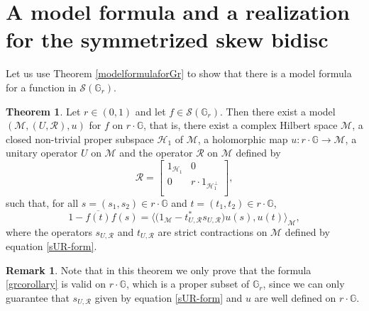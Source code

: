\documentclass[12pt,reqno]{amsart}
\numberwithin{equation}{section}
\theoremstyle{definition}
\newtheorem{thm}[equation]{Theorem}
\newtheorem{remark}[equation]{Remark}
\begin{document}
\section{A model formula and a realization for  the symmetrized skew bidisc}

Let us use Theorem \ref{modelformulaforGr} to show that there is a model formula for a function in $\mathcal{S}(\mathbb{G}_{r})$. 
\begin{thm}\label{modelforsur}
Let $r\in(0,1)$ and let $f\in\mathcal{S}(\mathbb{G}_{r})$. Then there exist a model $(\mathcal{M}, (U,\mathcal{R}), u)$ for $f$ on $r\cdot \mathbb{G}$, that is, there exist a complex Hilbert space $\mathcal{M}$,  a closed non-trivial proper subspace  $\mathcal{H}_{1}$ of $\mathcal{M}$,
 a holomorphic map $u:r\cdot \mathbb{G}\rightarrow \mathcal{M}$, a unitary operator $U$ on $\mathcal{M}$ and the operator $\mathcal{R}$ on $\mathcal{M}$ defined by 
\begin{equation}\label{RonM-2}
\mathcal{R}=\begin{bmatrix}
	1_{\mathcal{H}_{1}  } 	& 0                \\
	0 		& r\cdot 1_{\mathcal{H}_{1}^{\perp}}  	\\
\end{bmatrix},
\end{equation} 
such that, for all $s=(s_{1},s_{2})\in r\cdot\mathbb{G}$ and $t=(t_{1},t_{2})\in r \cdot \mathbb{G}$,
\begin{equation}\label{grcorollary}
1- \overline{f(t)}f(s) =\Bigg\langle  \bigg(1_{\mathcal{M}}-t_{U,\mathcal{R}}^{*}s_{U,\mathcal{R}}\bigg)u(s),u(t)\Bigg\rangle_{\mathcal{M}},
  \end{equation}
where the operators $s_{U,\mathcal{R}}$ and $t_{U,\mathcal{R}}$ are strict contractions on $\mathcal{M}$  defined by 
equation \eqref{sUR-form}.
\end{thm}
\begin{remark}
Note that in this theorem we only prove that the formula \eqref{grcorollary} is valid on $ r \cdot \mathbb{G}$, which is a proper subset of $\mathbb{G}_{r}$, since we can only guarantee that  $s_{U,\mathcal{R}}$ given by equation \eqref{sUR-form} and $u$ are well defined  on $ r \cdot \mathbb{G}$.
\end{remark}
\end{document}
